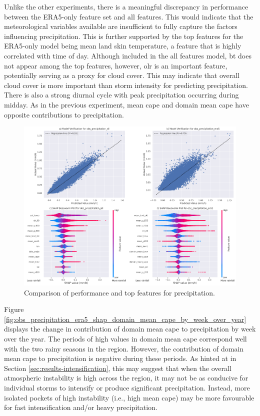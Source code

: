 Unlike the other experiments, there is a meaningful discrepancy in performance between the ERA5-only feature set and all features. This would indicate that the meteorological variables available are insufficient to fully capture the factors influencing precipitation. This is further supported by the top features for the ERA5-only model being mean land skin temperature, a feature that is highly correlated with time of day. Although included in the all features model, \acrfull{bt} does not appear among the top features, however, \acrfull{olr} is an important feature, potentially serving as a proxy for cloud cover. This may indicate that overall cloud cover is more important than storm intensity for predicting precipitation. There is also a strong diurnal cycle with peak precipitation occurring during midday. As in the previous experiment, mean \acrshort{cape} and domain mean \acrshort{cape} have opposite contributions to precipitation.

\begin{figure}[ht]
    \centering
    \includegraphics[width=\textwidth]{../figures/generated/experiments/obs_precipitation/obs_precipitation_summary.png}
    \caption{Comparison of performance and top features for precipitation.}
    \label{fig:obs_precipitation_summary}
\end{figure}

Figure \ref{fig:obs_precipitation_era5_shap_domain_mean_cape_by_week_over_year} displays the change in contribution of domain mean \acrshort{cape} to precipitation by week over the year. The periods of high values in domain mean \acrshort{cape} correspond well with the two rainy seasons in the region. However, the contribution of domain mean \acrshort{cape} to precipitation is negative during these periods. As hinted at in Section \ref{sec:results-intensification}, this may suggest that when the overall atmospheric instability is high across the region, it may not be as conducive for individual storms to intensify or produce significant precipitation. Instead, more isolated pockets of high instability (i.e., high mean \acrshort{cape}) may be more favourable for fast intensification and/or heavy precipitation.

